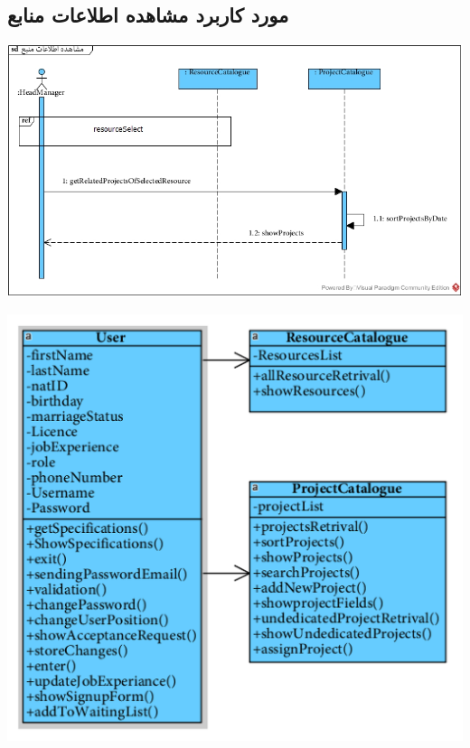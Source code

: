 \newpage
\vspace{1cm}
\subsection*{مورد کاربرد مشاهده اطلاعات منابع}
\vspace{2cm}
\begin{center}
\includegraphics[width=\textwidth]{SequenceDiagrams/36.jpg}
\end{center}

\newpage
\vspace{2cm}
\begin{center}
\includegraphics[width=\textwidth]{SequenceClasses/36.png}
\end{center}

